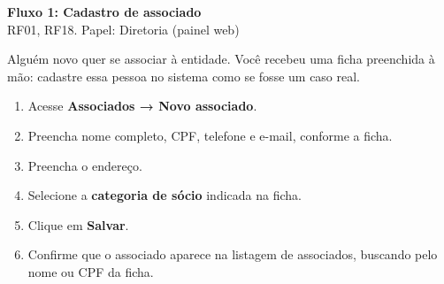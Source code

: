 \documentclass[11pt,a4paper]{article}
\begin{document}
\begin{center}
  {\LARGE\bfseries\color{brandgreen} Fluxo 1: Cadastro de associado}\\[1mm]
  {\large RF01, RF18. Papel: Diretoria (painel web)}
\end{center}

\vspace{2mm}
Alguém novo quer se associar à entidade. Você recebeu uma ficha preenchida à mão: cadastre essa
pessoa no sistema como se fosse um caso real.

\begin{enumerate}[leftmargin=6mm]
  \item Acesse \textbf{Associados → Novo associado}.
  \item Preencha nome completo, CPF, telefone e e-mail, conforme a ficha.
  \item Preencha o endereço.
  \item Selecione a \textbf{categoria de sócio} indicada na ficha.
  \item Clique em \textbf{Salvar}.
  \item Confirme que o associado aparece na listagem de associados, buscando pelo nome ou CPF da
    ficha.
\end{enumerate}
\end{document}

